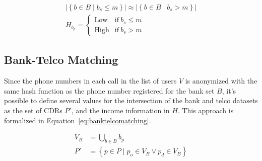 \begin{equation}
\label{eq:lowhighincome}
\begin{gathered}
	\left| \left\{ b \in B \mid b_s \leq m \right\} \right| \approx \left| \left\{ b \in B \mid b_s > m \right\} \right| \\
	H_{b_p} = \begin{cases} \text{Low} & \text{if} \ b_s \leq m \\ \text{High} & \text{if} \ b_s > m \end{cases}
\end{gathered}
\end{equation}

\subsection{Bank-Telco Matching}

Since the phone numbers in each call in the list of users $V$ is anonymized with the same hash function as the phone number registered for the bank set $B$, it's possible to define several values for the intersection of the bank and telco datasets as the set of CDRs $P'$, and the income information in $H$. This approach is formalized in Equation~\ref{eq:banktelcomatching}.

\begin{equation}
\label{eq:banktelcomatching}
\begin{aligned}
	V_B &= \bigcup_{b \in B} b_p \\
	P' &= \left\{ p \in P \mid p_o \in V_B \lor p_d \in V_B \right\}
\end{aligned}
\end{equation}
